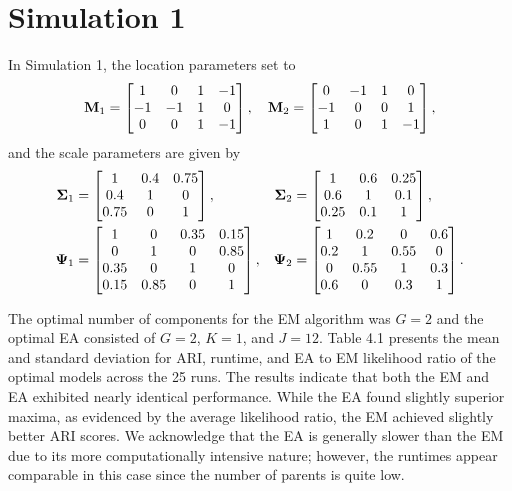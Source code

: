 \documentclass[12pt]{report}
\begin{document}
\section{Simulation 1}
In Simulation 1, the location parameters set to
$$
{\bf M}_1 =
\begin{bmatrix} 
1  &  0 & 1  & -1 \\
-1 & -1 &  1 & 0\\
 0 & 0  & 1 & -1
\end{bmatrix}, \quad 
{\bf M}_2 =
\begin{bmatrix} 
0  &  -1 & 1  & 0 \\
-1 & 0 &  0 & 1\\
 1 & 0  & 1 & -1
\end{bmatrix},
$$
and the scale parameters are given by
\begin{align*}
{\bf \Sigma}_1 &=
\begin{bmatrix} 
1  &  0.4 & 0.75   \\
0.4 & 1 &  0\\
 0.75 & 0  & 1 
\end{bmatrix}, & 
{\bf \Sigma}_2 &=
\begin{bmatrix} 
1 &  0.6 & 0.25  \\
0.6 & 1 &  0.1 \\
 0.25 & 0.1  & 1 
\end{bmatrix},
\\
{\bf \Psi}_1 &=
\begin{bmatrix} 
      1  &      0 &   0.35  & 0.15 \\
      0 &       1 &    0      & 0.85\\
 0.35 &       0  &   1      & 0\\
 0.15 &   0.85  &   0     & 1
\end{bmatrix}, & 
{\bf \Psi}_2 &=
\begin{bmatrix} 
      1  &      0.2 &     0  & 0.6 \\
      0.2 &       1 &       0.55      & 0\\
      0 &        0.55  &   1      & 0.3\\
   0.6 &       0  &             0.3     & 1
\end{bmatrix}.
\end{align*}

The optimal number of components for the EM algorithm was $G=2$ and the optimal EA consisted of $G=2$, $K=1$, and $J=12$. Table 4.1 presents the mean and standard deviation for ARI, runtime, and EA to EM likelihood ratio of the optimal models across the 25 runs. The results indicate that both the EM and EA exhibited nearly identical performance. While the EA found slightly superior maxima, as evidenced by the average likelihood ratio, the EM achieved slightly better ARI scores. We acknowledge that the EA is generally slower than the EM due to its more computationally intensive nature; however, the runtimes appear comparable in this case since the number of parents is quite low.
\end{document}
